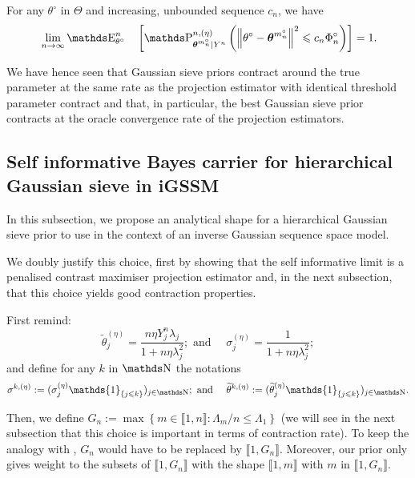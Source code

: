 \begin{cor}\label{COR_BAYES_GAUSS_CONTRACT_ORACLESIEVE}
For any $\theta^{\circ}$ in $\Theta$ and increasing, unbounded sequence $c_{n}$, we have
\begin{alignat*}{3}
& && \lim\limits_{n \rightarrow \infty} \E_{\theta^{\circ}}^{n}&&\left[\P_{\boldsymbol{\theta}^{m_{n}^{\circ}}\vert Y^{n}}^{n, (\eta)}\left(\left\Vert \theta^{\circ} - \boldsymbol{\theta}^{m_{n}^{\circ}}\right\Vert^{2} \leq c_{n} \Phi^{\circ}_{n} \right)\right] = 1.
\end{alignat*}
\end{cor}

We have hence seen that Gaussian sieve priors contract around the true parameter at the same rate as the projection estimator with identical threshold parameter contract and that, in particular, the best Gaussian sieve prior contracts at the oracle convergence rate of the projection estimators.

\subsection{Self informative Bayes carrier for hierarchical Gaussian sieve in iGSSM}
In this subsection, we propose an analytical shape for a hierarchical Gaussian sieve prior to use in the context of an inverse Gaussian sequence space model.

We doubly justify this choice, first by showing that the self informative limit is a penalised contrast maximiser projection estimator and, in the next subsection, that this choice yields good contraction properties.

\medskip

First remind:
\[\widetilde{\theta}^{(\eta)}_{j} = \frac{n \eta Y^{n}_{j} \lambda_{j}}{1 + n \eta \lambda_{j}^{2}}; \text{ and }\quad \sigma^{(\eta)}_{j} = \frac{1}{1 + n \eta \lambda_{j}^{2}};\]
and define for any $k$ in $\N$ the notations
\[\sigma^{k, (\eta)} := (\sigma_{j}^{(\eta)} \mathds{1}_{\{j \leq k\}})_{j \in \N}; \text{ and }\quad \widetilde{\theta}^{k, (\eta)} := (\widetilde{\theta}_{j}^{(\eta)} \mathds{1}_{\{j \leq k\}})_{j \in \N}.\]

Then, we define $G_{n} := \max\left\{m \in \llbracket 1, n \rrbracket : \Lambda_{m} / n \leq \Lambda_{1}\right\}$ (we will see in the next subsection that this choice is important in terms of contraction rate).
To keep the analogy with , $G_{n}$ would have to be replaced by $\llbracket 1, G_{n} \rrbracket$.
Moreover, our prior only gives weight to the subsets of $\llbracket 1, G_{n} \rrbracket$ with the shape $\llbracket 1, m \rrbracket$ with $m$ in $\llbracket 1, G_{n} \rrbracket$.

